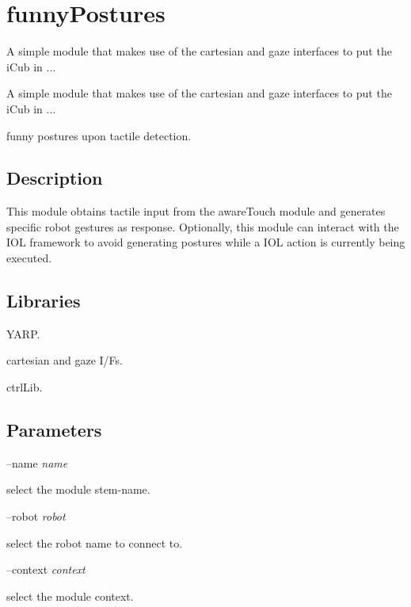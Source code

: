 \section{funny\+Postures}
\label{group__icub__funnyPostures}


A simple module that makes use of the cartesian and gaze interfaces to put the i\+Cub in ...  


A simple module that makes use of the cartesian and gaze interfaces to put the i\+Cub in ... 

funny postures upon tactile detection.\hypertarget{group__icub__iCubWriter_intro_sec}{}\subsection{Description}\label{group__icub__iCubWriter_intro_sec}
This module obtains tactile input from the aware\+Touch module and generates specific robot gestures as response. Optionally, this module can interact with the I\+OL framework to avoid generating postures while a I\+OL action is currently being executed.\hypertarget{group__icub__iCubWriter_lib_sec}{}\subsection{Libraries}\label{group__icub__iCubWriter_lib_sec}

\begin{DoxyItemize}
\item Y\+A\+RP.
\item cartesian and gaze I/F\textquotesingle{}s.
\item ctrl\+Lib.
\end{DoxyItemize}\hypertarget{group__icub__iCubWriter_parameters_sec}{}\subsection{Parameters}\label{group__icub__iCubWriter_parameters_sec}
--name {\itshape name} 
\begin{DoxyItemize}
\item select the module stem-\/name.
\end{DoxyItemize}

--robot {\itshape robot} 
\begin{DoxyItemize}
\item select the robot name to connect to.
\end{DoxyItemize}

--context {\itshape context} 
\begin{DoxyItemize}
\item select the module context.
\end{DoxyItemize}

